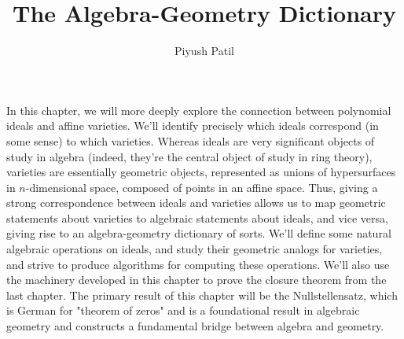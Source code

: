 \documentclass{article}
\newcommand*{\n}{\newline}
\begin{document}
\title{The Algebra-Geometry Dictionary}
\author{Piyush Patil}
\maketitle

In this chapter, we will more deeply explore the connection between polynomial ideals and affine varieties. We'll identify precisely which ideals correspond (in some sense) to which varieties. Whereas ideals are very significant objects of study in algebra (indeed, they're the central object of study in ring theory), varieties are essentially geometric objects, represented as unions of hypersurfaces in $ n $-dimensional space, composed of points in an affine space. Thus, giving a strong correspondence between ideals and varieties allows us to map geometric statements about varieties to algebraic statements about ideals, and vice versa, giving rise to an algebra-geometry dictionary of sorts. We'll define some natural algebraic operations on ideals, and study their geometric analogs for varieties, and strive to produce algorithms for computing these operations. We'll also use the machinery developed in this chapter to prove the closure theorem from the last chapter.
\n
The primary result of this chapter will be the Nullstellensatz, which is German for "theorem of zeros" and is a foundational result in algebraic geometry and constructs a fundamental bridge between algebra and geometry.
\end{document}

